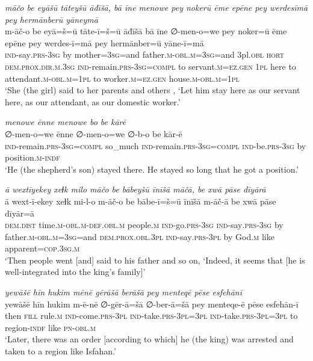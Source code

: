 \ea \label{KŠ.43}
\textit{māčo be eyāšū tāteyšū āđīšā, bā īne menowe pey nokerū ēme epēne pey werdesīmā pey hermānberū yāneymā} \\ 
\gll m-āč-o be eyā=š=ū tāte-ī=š=ū āđīšā bā īne ∅-men-o=we pey noker=ū ēme epēne pey werdes-ī=mā pey hermānber=ū yāne-ī=mā \\ 
 \textsc{ind-}say\textsc{.prs}\textsc{-3sg} by mother\textsc{=3sg}=and father\textsc{.m}\textsc{-obl}\textsc{.m}\textsc{=3sg}=and 3pl\textsc{.obl} \textsc{hort} \textsc{dem.prox}\textsc{.dir}\textsc{.m}\textsc{.3sg} \textsc{ind-}remain\textsc{.prs}\textsc{-3sg}\textsc{=compl} to servant\textsc{.m}\textsc{=ez.gen} \textsc{1pl} here to attendant\textsc{.m}\textsc{-obl}\textsc{.m}\textsc{=\textsc{1pl}} to worker\textsc{.m}\textsc{=ez.gen} house\textsc{.m}\textsc{-obl}\textsc{.m}\textsc{=\textsc{1pl}} \\ 
\glt `She (the girl) said to her parents and others , ‘Let him stay here as our servant here, as our attendant, as our domestic worker.'
\z 
 
\ea \label{KŠ.44}
\textit{menowe ēnne menowe bo be kārē} \\ 
\gll ∅-men-o=we ēnne ∅-men-o=we ∅-b-o be kār-ē \\ 
 \textsc{ind-}remain\textsc{.prs}\textsc{-3sg}\textsc{=compl} so\_much \textsc{ind-}remain\textsc{.prs}\textsc{-3sg}\textsc{=compl} \textsc{ind-}be\textsc{.prs}\textsc{-3sg} by position\textsc{.m}\textsc{-indf} \\ 
\glt `He (the shepherd’s son) stayed there. He stayed so long that he got a position.'
\z 
 
\ea \label{KŠ.46}
\textit{ā wextīyekey xeɫk milo māčo be bābeyšū īnīšā māčā, be xwā pāse dīyārā} \\ 
\gll ā wext-ī-ekey xeɫk mi-l-o m-āč-o be bābe-ī=š=ū īnīšā m-āč-ā be xwā pāse dīyār=ā \\ 
 \textsc{dem.dist} time\textsc{.m}\textsc{-obl}\textsc{.m}\textsc{-def}\textsc{.obl}\textsc{.m} people\textsc{.m} \textsc{ind-}go\textsc{.prs}\textsc{-3sg} \textsc{ind-}say\textsc{.prs}\textsc{-3sg} by father\textsc{.m}\textsc{-obl}\textsc{.m}\textsc{=3sg}=and \textsc{dem.prox}\textsc{.obl}\textsc{.3pl} \textsc{ind-}say\textsc{.prs}\textsc{-3pl} by God\textsc{.m} like apparent\textsc{=cop}\textsc{.3sg}\textsc{.m} \\ 
\glt `Then people went [and] said to his father and so on, ‘Indeed, it seems that [he is well-integrated into the king’s family]'
\z 
 
\ea \label{KŠ.47}
\textit{yewāšē hīn hukim mēnē gērāšā berāšā pey menteqē pēse esfehānī} \\ 
\gll yewāšē hīn hukim m-ē-nē ∅-gēr-ā=šā ∅-ber-ā=šā pey menteqe-ē pēse esfehān-ī \\ 
 then \textsc{fill} rule\textsc{.m} \textsc{ind-}come\textsc{.prs}\textsc{-3pl} \textsc{ind-}take\textsc{.prs}\textsc{-3pl}\textsc{=3pl} \textsc{ind-}take\textsc{.prs}\textsc{-3pl}\textsc{=3pl} to region\textsc{-indf} like \textsc{pn}\textsc{-obl}\textsc{.m} \\ 
\glt `Later, there was an order [according to which] he (the king) was arrested and taken to a region like Isfahan.'
\z 
 
